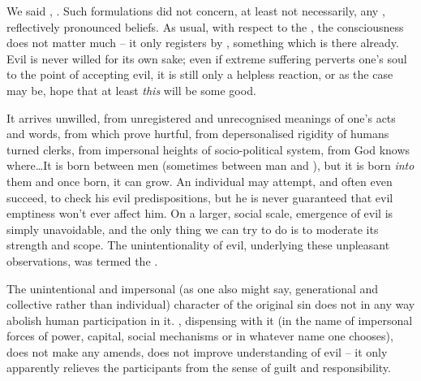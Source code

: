 \pa\label{pa:originalSinII}
We said , . Such
formulations  did not concern, at least not necessarily, any
, reflectively pronounced beliefs. As usual, with respect to the
, the 
consciousness does not matter much -- it only registers by ,
 something which is there already.
Evil is never willed for its own sake; even if extreme suffering perverts one's
soul to the point of accepting evil, it is still only a helpless reaction, or as
the case may be, hope that at least {\em this} will be some good.

It arrives unwilled, from unregistered and unrecognised meanings of one's acts
and words, from  which prove hurtful, from depersonalised
rigidity of humans turned clerks, from impersonal heights of socio-political
system, from God knows where\ldots It is born between men (sometimes between man
and ), but it is born {\em into} them and once born, it can
grow. An individual may attempt, 
and often even succeed, to check his evil predispositions, but he is never
guaranteed that evil emptiness won't ever affect him. On a larger, social scale,
emergence of evil is simply unavoidable, and the only thing we can try to do is
to moderate its strength and scope. The unintentionality of evil, underlying
these unpleasant observations, was termed the .


\pa The unintentional and impersonal (as one also might say, generational and
collective rather than individual) character of the original sin does not in any
way abolish human participation in it. , dispensing
with it (in the name of impersonal forces of power, capital, social mechanisms or in
whatever name one chooses), does not make any amends, does not improve
understanding of evil -- it only apparently relieves the participants from the
sense of guilt and responsibility.

